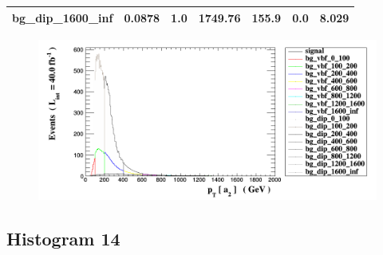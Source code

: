 \documentclass[a4paper, 10pt]{article}
\begin{document}
\begin{table}[H]
\begin{center}
\begin{tabular}{|m{23.0mm}|m{23.0mm}|m{18.0mm}|m{19.0mm}|m{19.0mm}|m{19.0mm}|m{19.0mm}|}
      \hline
      {\cellcolor{white}         bg\_dip\_1600\_inf}& {\cellcolor{white}         0.0878}& {\cellcolor{white}         1.0}& {\cellcolor{white}         1749.76}& {\cellcolor{white}         155.9}& {\cellcolor{orange}         0.0}& {\cellcolor{orange}         8.029}\\
\hline
    \end{tabular}
  \end{center}
\end{table}

\begin{figure}[H]
  \begin{center}
    \includegraphics[scale=0.45]{selection_12.png}\\
\caption{   }
  \end{center}
\end{figure}
      \newpage
\subsection{ Histogram 14}
\end{document}
